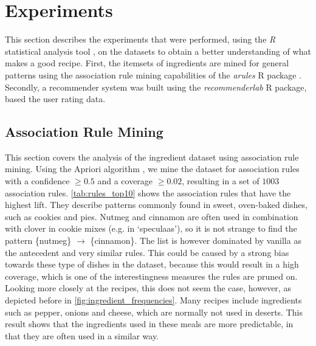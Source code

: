 \section{Experiments}
\label{sec:experiments}

This section describes the experiments that were performed, using the \emph{R} statistical analysis tool \citep{R2016}, on the datasets to obtain a better understanding of what makes a good recipe.
First, the itemsets of ingredients are mined for general patterns using the association rule mining capabilities of the \emph{arules} R package \citep{Hahsler2007}.
Secondly, a recommender system was built using the \emph{recommenderlab} \citep{Hahsler2011} R package, based the user rating data.




\subsection{Association Rule Mining}
\label{subsec:association_rule_mining}


%
%	

This section covers the analysis of the ingredient dataset using association rule mining.
Using the Apriori algorithm \citep{Agrawal1993}, we mine the dataset for association rules with a confidence $\geq 0.5$ and a coverage $\geq 0.02$, resulting in a set of $1003$ association rules.
\cref{tab:rules_top10} shows the association rules that have the highest lift.
They describe patterns commonly found in sweet, oven-baked dishes, such as cookies and pies.
Nutmeg and cinnamon are often used in combination with clover in cookie mixes (e.g. in `speculaas'), so it is not strange to find the pattern \{nutmeg\} $\rightarrow$ \{cinnamon\}.
The list is however dominated by vanilla as the antecedent and very similar rules.
This could be caused by a strong bias towards these type of dishes in the dataset, because this would result in a high coverage, which is one of the interestingness measures the rules are pruned on.
Looking more closely at the recipes, this does not seem the case, however, as depicted before in \cref{fig:ingredient_frequencies}.
Many recipes include ingredients such as pepper, onions and cheese, which are normally not used in deserts.
This result shows that the ingredients used in these meals are more predictable, in that they are often used in a similar way.

